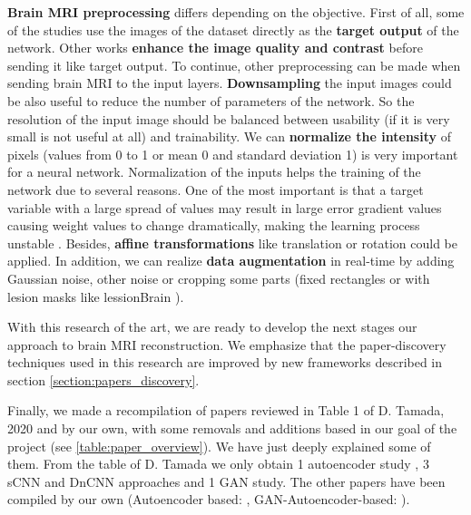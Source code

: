 \textbf{Brain MRI preprocessing} differs depending on the objective. First of all, some of the studies use the images of the dataset directly as the \textbf{target output} of the network. Other works \textbf{enhance the image quality and contrast} before sending it like target output. 
To continue, other preprocessing can be made when sending brain MRI to the input layers. \textbf{Downsampling} the input images could be also useful to reduce the number of parameters of the network. So the resolution of the input image should be balanced between usability (if it is very small is not useful at all) and trainability. We can \textbf{normalize the intensity} of pixels (values from 0 to 1 or mean 0 and standard deviation 1) is very important for a neural network.  Normalization of the inputs helps the training of the network due to several reasons. One of the most important is that a target variable with a large spread of values may result in large error gradient values causing weight values to change dramatically, making the learning process unstable \cite{bishop1995neural}. Besides, \textbf{affine transformations} like translation or rotation could be applied. In addition, we can realize \textbf{data augmentation} in real-time by adding Gaussian noise, other noise or cropping some parts (fixed rectangles or with lesion masks like lessionBrain \cite{lesionBrain}).
  


With this research of the art, we are ready to develop the next stages our approach to brain MRI reconstruction. We emphasize that the paper-discovery techniques used in this research are improved by new frameworks described in section \ref{section:papers_discovery}.

Finally, we made a recompilation of papers reviewed in Table 1 of D. Tamada, 2020 \cite{tamada2020review} and by our own, with some removals and additions based in our goal of the project (see \ref{table:paper_overview}). We have just deeply explained some of them. From the table of D. Tamada we only obtain 1 autoencoder study \cite{bermudez2018t1autoencoder}, 3 sCNN and DnCNN approaches \cite{kidoh2019scnnt1} \cite{ganHR3d} \cite{dncnnnoise2noise} and 1 GAN study.  The other papers have been compiled by our own (Autoencoder based: \cite{pinaya2019} \cite{myronenko20183d} \cite{gondara2016medicalautoencoder} \cite{superresolution} \cite{fuzzyautoencoder} \cite{learnvolrepreCODE} \cite{otherBraTS2020}, GAN-Autoencoder-based: \cite{wganautoencoder}).



